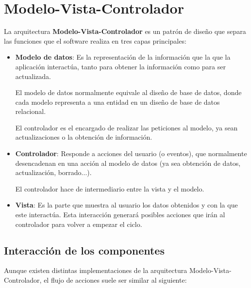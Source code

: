 \chapter{Modelo-Vista-Controlador}

La arquitectura \textbf{Modelo-Vista-Controlador} es un patrón de diseño que separa las funciones que el software realiza en tres capas principales:

\begin{itemize}
    \item \textbf{Modelo de datos}: Es la representación de la información que la que la aplicación interactúa, tanto para obtener la información como para ser actualizada.

    El modelo de datos normalmente equivale al diseño de base de datos, donde cada modelo representa a una entidad en un diseño de base de datos relacional.

    El controlador es el encargado de realizar las peticiones al modelo, ya sean actualizaciones o la obtención de información.

    \item \textbf{Controlador}: Responde a acciones del usuario (o eventos), que normalmente desencadenan en una acción al modelo de datos (ya sea obtención de datos, actualización, borrado...).

    El controlador hace de intermediario entre la vista y el modelo.

    \item \textbf{Vista}: Es la parte que muestra al usuario los datos obtenidos y con la que este interactúa. Esta interacción generará posibles acciones que irán al controlador para volver a empezar el ciclo.
\end{itemize}

\section{Interacción de los componentes}

Aunque existen distintas implementaciones de la arquitectura Modelo-Vista-Controlador, el flujo de acciones suele ser similar al siguiente:

